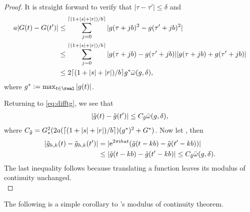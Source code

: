 \begin{appendices}
\begin{proof}
   It is straight forward to verify that  $\vert \tau - \tau' \vert \le \delta$ and 
\begin{align}
a  \vert G(t) - G(t') \vert & \le  \sum_{j = 0}^{\lceil ( 1 + \vert s \vert  +\vert r \vert )/b \rceil} \vert g(\tau + j b)^2 - g(\tau' + j b)^2\vert\notag\\
  & \le \sum_{j = 0}^{\lceil (1 + \vert s \vert  +\vert r\vert )/b \rceil} \vert g(\tau + j b) - g(\tau' + j b) \vert \vert g(\tau + j b) + g(\tau' + j b)\vert\notag\\
  & \le 2 \lceil (1 + \vert s \vert  + \vert r \vert)/b\rceil g^*{\bar{\omega}}({g},\delta),
  \label{}
\end{align}
where $g^* := \max_{t \in \real} \vert g(t)\vert $.
\begin{comment}
On the other hand, if $\vert \tau - \tau'\vert > \delta$, then 
\begin{align}
  &a\vert G(t) - G(t') \vert \notag \\
  &\quad \le \vert g(\tau')^2 - g(r)^2\vert +   \vert g(s)^2 - g(\tau + c)^2 \vert\notag \\
  &\qquad +\sum_{j = 1}^{\lceil (s + r)/b \rceil} \{\vert g(\tau + (j-1) b)^2 - g(\tau' + j b)^2\vert\}.  \notag
  \label{}
\end{align}
where $c = \lfloor (\vert s\vert  + \vert r \vert )/b \rfloor b $. It follows as above that 
\begin{align}
\vert G(t) - G(t') \vert \le 2a (\lceil (s + r)/b\rceil +1)g^*\modc{g}{\delta}.
\end{align}
\end{comment}
Returning to \eqref{eq:difftg}, we see that
\begin{align}
  \vert \tilde{g}(t) - \tilde{g}(t')\vert \le C_{\tilde{g}} {\bar{\omega}}({g},\delta),\notag
  \label{}
\end{align}
where $C_{\tilde{g}} = G_*^2(2a (\lceil ( 1 + \vert s \vert  +\vert r\vert)/b\rceil)(g^*)^2 + G^*)$. Now let \hkints, then
\begin{align}
  \vert \tilde{g}_{h,k}(t) - \tilde{g}_{h,k}(t')\vert & = \vert \mathrm{e}^{2 \pi \mathrm{i} h a t} (\tilde{g}(t - kb) -\tilde{g}(t'-kb)) \vert\notag\\
  &\le \vert \tilde{g}(t - kb) -\tilde{g}(t'-kb) \vert \le C_{\tilde{g}} {\bar{\omega}}({g},\delta).
  \label{}
\end{align}
The last inequality follows because translating a function leaves its modulus of continuity unchanged.\\
\end{proof}
The following is a simple corollary to \levy's modulus of continuity theorem. 


\end{appendices}

